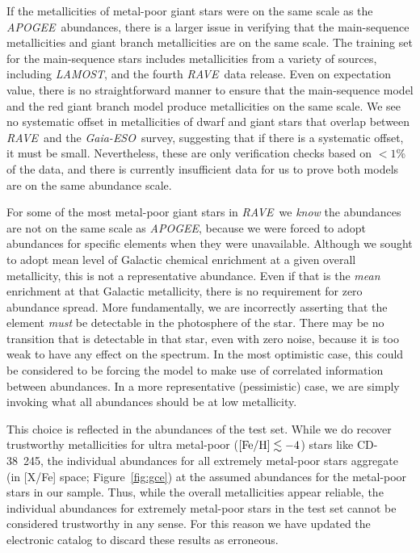 \documentclass[preprint]{aastex}
\newcommand{\acronym}[1]{{\small{#1}}}
\newcommand{\project}[1]{\textsl{#1}}
\newcommand{\rave}{\project{\acronym{RAVE}}}
\newcommand{\ges}{\project{Gaia-ESO}}
\newcommand{\apogee}{\project{\acronym{APOGEE}}}
\newcommand{\lamost}{\project{\acronym{LAMOST}}}
\begin{document}
If the metallicities of metal-poor giant stars were on the same scale as the \apogee\
abundances, there is a larger issue in verifying that the main-sequence metallicities
and giant branch metallicities are on the same scale.  The training set for the
main-sequence stars includes metallicities from a variety of sources, including
\lamost, and the fourth \rave\ data release.  Even on expectation value, there is 
no straightforward manner to ensure that the main-sequence model and the red giant
branch model produce metallicities on the same scale.  We see no systematic offset
in metallicities of dwarf and giant stars that overlap between \rave\ and the \ges\
survey, suggesting that if there is a systematic offset, it must be small. 
Nevertheless, these are only verification checks based on $<1$\% of the data, and 
there is currently insufficient data for us to prove both models are on the same 
abundance scale.


For some of the most metal-poor giant stars in \rave\, we \emph{know} the abundances 
are not on the same scale as \apogee, because we were forced to adopt abundances for 
specific elements when they were unavailable.  Although we sought to adopt mean
level of Galactic chemical enrichment at a given overall metallicity, this is not a
representative abundance. Even if that is the \emph{mean} enrichment at that Galactic
metallicity, there is no requirement for zero abundance spread.  More fundamentally, 
we are incorrectly asserting that the element \emph{must} be detectable in the 
photosphere of the star.  There may be no transition that is detectable in that 
star, even with zero noise, because it is too weak to have any effect on the 
spectrum.  In the most optimistic case, this could be considered to be forcing the
model to make use of correlated information between abundances.  In a more 
representative (pessimistic) case, we are simply invoking what all abundances should 
be at low metallicity.


This choice is reflected in the abundances of the test set.  While we do recover
trustworthy metallicities for ultra metal-poor ($[{\rm Fe/H}] \lesssim -4$) stars like 
CD-38~245, the individual abundances for all extremely metal-poor stars aggregate
(in [X/Fe] space; Figure~\ref{fig:gce}) at the assumed abundances for the metal-poor
stars in our sample.  Thus, while the overall metallicities appear reliable, the 
individual abundances for extremely metal-poor stars in the test set cannot be
considered trustworthy in any sense.  For this reason we have updated the electronic
catalog to discard these results as erroneous.
\end{document}
